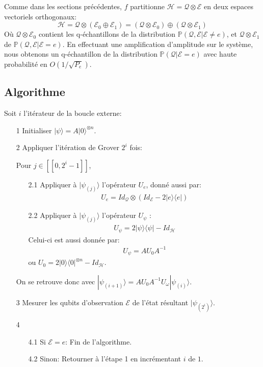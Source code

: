Comme dans les sections précédentes, $f$ partitionne $\mathcal{H} = \mathcal{Q} \otimes \mathcal{E}$ en deux espaces vectoriels orthogonaux:
\[\mathcal{H} = \mathcal{Q} \otimes (\mathcal{E}_0 \oplus \mathcal{E}_1) = (\mathcal{Q} \otimes \mathcal{E}_0) \oplus (\mathcal{Q} \otimes \mathcal{E}_1)\]
Où $\mathcal{Q} \otimes \mathcal{E}_0$ contient les q-échantillons de la distribution $\mathbb{P}(\mathcal{Q,E}|\mathcal{E}\neq e)$, et $\mathcal{Q} \otimes \mathcal{E}_1$ de $\mathbb{P}(\mathcal{Q,E}|\mathcal{E} = e)$.
En effectuant une amplification d'amplitude sur le système, nous obtenons un q-échantillon de la distribution $\mathbb{P}(\mathcal{Q}|\mathcal{E} = e)$ avec haute probabilité en $O(1/\sqrt{P_e})$.

\subsection{Algorithme}

Soit $i$ l'itérateur de la boucle externe:
\begin{itemize}
    \item[1] Initialiser $|\psi \rangle = A|0\rangle^{\otimes n}$.
    \item[2] Appliquer l'itération de Grover $2^i$ fois:
    \item[] Pour $j \in [\![0, 2^i-1]\!]$,
    \begin{itemize}
  	 
   	 \item[2.1] Appliquer à $|\psi_{(j)}\rangle$ l'opérateur $U_{e}$, donné aussi par:
   	 \begin{align*}
   	 U_{e} = Id_{\mathcal{Q}} \otimes (Id_{\mathcal{E}} -  2|e \rangle \langle e| )
   	 \end{align*}
   	 \item[2.2] Appliquer à $|\psi_{(j)}\rangle$ l'opérateur $U_{\psi}$ :
    	\begin{align*}
   	 U_{\psi} = 2|\psi\rangle \langle \psi | - Id_{\mathcal{H}}
   	 \end{align*}
    	Celui-ci est aussi donnée par:
    	\begin{align*}
    	U_{\psi} = AU_{0}A^{-1}
   	 \end{align*}
    	ou $U_{0} = 2|0\rangle \langle 0|^{\otimes n} - Id_{\mathcal{H}}$.
   	 
    \end{itemize}
    \item[] On se retrouve donc avec $|\psi_{(i+1)}\rangle = AU_{0}A^{-1}U_{\omega} |\psi_{(i)} \rangle$.
    \item[3] Mesurer les qubits d'observation $\mathcal{E}$ de l'état résultant $|\psi_{(2^i)} \rangle$.
	\item[4]
	\begin{itemize}
   	 \item[4.1] Si $\mathcal{E}=e$: Fin de l'algorithme.
   	 \item[4.2] Sinon: Retourner à l'étape 1 en incrémentant $i$ de $1$.
    \end{itemize}
\end{itemize}
